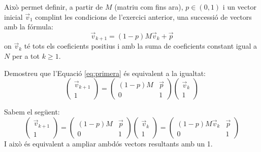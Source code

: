 \documentclass[a4paper, 12pt]{article}
\begin{document}
    \noindent Això permet definir, a partir de $M$ (matriu com fins ara), $p \in (0,1)$ i un vector inicial $\vec{v}_1$
    complint les condicions de l'exercici anterior, una successió de vectors amb la fórmula:
    \begin{equation}\label{eq:primera}
        \vec{v}_{k+1} = (1 - p)M\vec{v}_k + \vec{p}
    \end{equation}
    on $\vec{v}_k$ té tots els coeficients positius i amb la suma de coeficients constant igual a $N$
    per a tot $k \geq 1$.
    
    \begin{exercici}
        Demostreu que l'Equació \eqref{eq:primera} és equivalent a la igualtat:
        \begin{displaymath}
            \left(
                \begin{array}{c}
                    \vec{v}_{k+1} \\
                    \hline 1
                \end{array}
            \right)
            =
            \left(
                \begin{array}{c|c}
                    (1 - p)M & \vec{p} \\
                    \hline 0 & 1
                \end{array}
            \right)
            \left(
                \begin{array}{c}
                    \vec{v}_k \\
                    \hline 1
                \end{array}
            \right)
        \end{displaymath}
    \end{exercici}
    \begin{solucio}
        Sabem el següent:
        \begin{displaymath}
            \left(
                \begin{array}{c}
                    \vec{v}_{k+1} \\
                    \hline 1
                \end{array}
            \right)
            =
            \left(
                \begin{array}{c|c}
                    (1 - p)M & \vec{p} \\
                    \hline 0 & 1
                \end{array}
            \right)
            \left(
                \begin{array}{c}
                    \vec{v}_k \\
                    \hline 1
                \end{array}
            \right)
            = \left(
                \begin{array}{c|c}
                    (1 - p)M\vec{v}_k & \vec{p} \\
                    \hline 0 & 1
                \end{array}
            \right)
        \end{displaymath}
        I això és equivalent a ampliar ambdós vectors resultants amb un 1. 
    \end{solucio}
    
\end{document}
